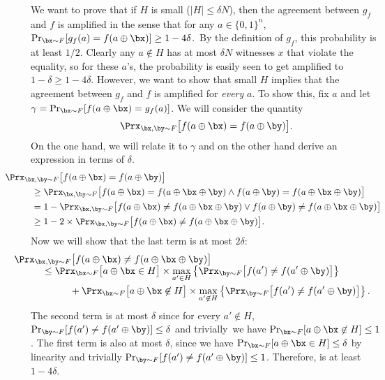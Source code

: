 \documentclass[11pt]{article}
\theoremstyle{definition}
\begin{document}
\begin{proofof}{}
We want to prove that if $H$ is small ($|H| \leq \delta N$), then the agreement between $g_f$ and $f$ is amplified in the sense that for any $a\in \{0,1\}^n$,  $\Pr_{\bx \sim F}[g_f(a)=f(a \oplus \bx)] \geq 1-4\delta$.~By the definition of $g_f$, this probability is at least $1/2$. Clearly any $a \not \in H$ has at most $\delta N$ witnesses $x$ that violate the equality, so for these $a$'s, the probability is easily seen to get amplified to $1-\delta \geq 1-4\delta$. However, we want to show that small $H$ implies that the agreement between $g_f$ and $f$ is amplified for {\it every} $a$. 
To show this, fix $a$ and let $\gamma = \Pr_{\bx \sim F}[f(a \oplus \bx) = g_f(a)]$.
We will consider the quantity
\begin{equation}\label{amplif-eqn}
\Prx_{\bx,\by \sim F}\big[f(a \oplus \bx) = f(a \oplus \by)\big].
\end{equation}
On the one hand, we will relate it to $\gamma$ and on the other hand derive an expression in terms of $\delta$.
\begin{align*}
         &\hspace{-1 cm}\Prx_{\bx,\by \sim F}\big[f(a \oplus \bx) = f(a \oplus \by)\big]
         \\&\geq \Prx_{\bx,\by \sim F}\big[f(a \oplus \bx)=f(a \oplus \bx \oplus \by) \land  f(a \oplus \by)=f(a \oplus \bx \oplus \by )\big]  \\
        &= 1 - \Prx_{\bx,\by \sim F}\big[f(a \oplus \bx) \neq f(a \oplus \bx \oplus \by) \lor  f(a \oplus \by) \neq f(a \oplus \bx \oplus \by)\big] \\
        & \geq 1 - 2 \times \Prx_{\bx, \by \sim F} \big[f(a \oplus \bx) \neq f(a \oplus \bx \oplus \by)\big].
\end{align*}
Now we will show that the last term is at most $2 \delta$:
\begin{align*}
        &\hspace{-1 cm}\Prx_{\bx, \by \sim F}\big[f(a \oplus \bx) \neq f(a \oplus \bx \oplus \by)\big]\\[-1ex]
        &\leq \Prx_{\bx \sim F}\big[a \oplus \bx \in H\big] \times \max_{a' \in H} \left\{ \Prx_{\by \sim F}\big[f(a') \neq f(a' \oplus \by)\big] \right\} \\ 
        &\hspace{1cm}+ \Prx_{\bx \sim F}\big[a \oplus \bx \not \in H\big] \times \max_{a' \not \in H} \left\{\Prx_{\by \sim F}\big[f(a') \neq f(a' \oplus \by)\big]\right\}.
    \end{align*}
The second term is at most $\delta$ since for every $a' \not \in H$, $\Pr_{\by \sim F}[f(a') \neq f(a' \oplus \by)] \leq \delta$ and trivially~we have $\Pr_{\bx \sim F}[a \oplus \bx \not \in H] \leq 1$.
The first term is also at most $\delta$, since we have $\Pr_{\bx \sim F}[a \oplus \bx \in H] \leq \delta$  by linearity and trivially $\Pr_{\by \sim F}[f(a') \neq f(a' \oplus \by)] \leq 1$. 
Therefore,  is at least $1-4 \delta$.


\end{proofof}
\end{document}
